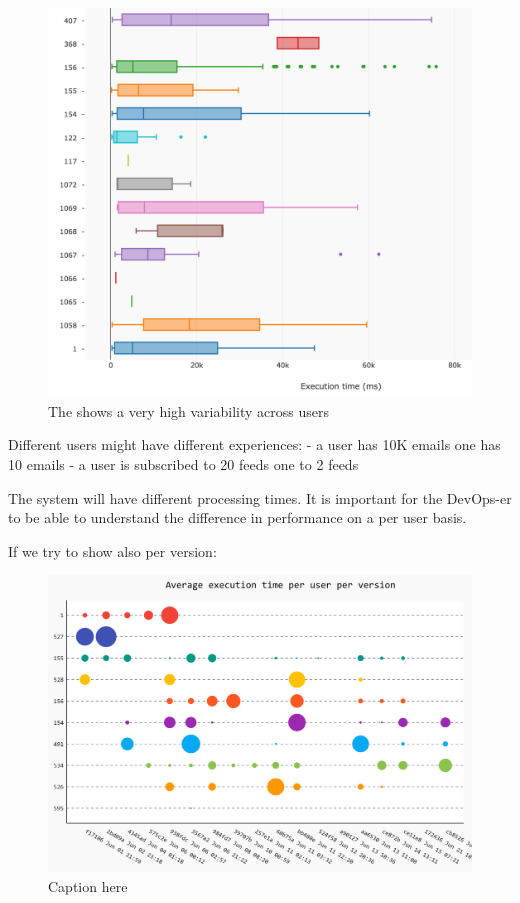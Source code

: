 \documentclass[conference]{IEEEtran}
\begin{document}
  \begin{figure}[!ht]
    \centering
    \includegraphics[width=\linewidth]{time_per_user}
    \caption{The \epFeedItems shows a very high variability across users}
    \label{fig:tpu}
  \end{figure}


  Different users might have different experiences: 
  - a user has 10K emails one has 10 emails
  - a user is subscribed to 20 feeds one to 2 feeds

  The system will have different processing times. 
  It is important for the DevOps-er to be able to understand the difference in performance on a per user basis. 

  If we try to show also per version: 

  \begin{figure}[!ht]
    \centering
    \includegraphics[width=\linewidth]{time_per_user_per_version}
    \caption{Caption here}
    \label{fig:figure1}
  \end{figure}
\end{document}
